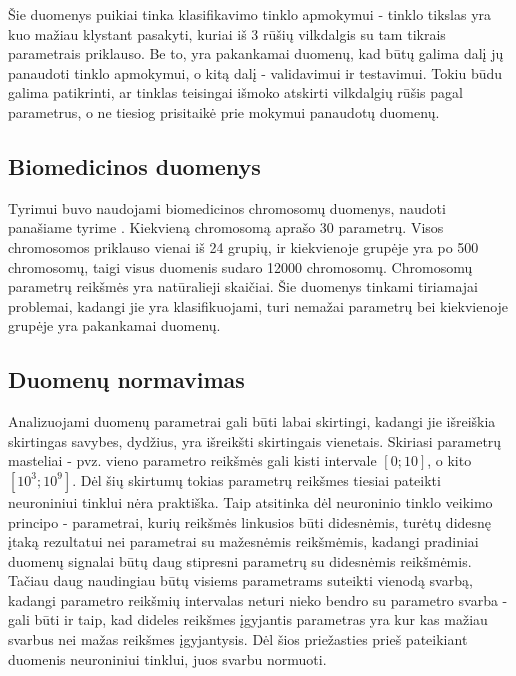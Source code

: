 \documentclass{VUMIFPSbakalaurinis}
\begin{document}
Šie duomenys puikiai tinka klasifikavimo tinklo apmokymui - tinklo tikslas yra kuo mažiau klystant pasakyti, kuriai iš 3 rūšių vilkdalgis su tam tikrais parametrais priklauso.
Be to, yra pakankamai duomenų, kad būtų galima dalį jų panaudoti tinklo apmokymui, o kitą dalį - validavimui ir testavimui.
Tokiu būdu galima patikrinti, ar tinklas teisingai išmoko atskirti vilkdalgių rūšis pagal parametrus, o ne tiesiog prisitaikė prie mokymui panaudotų duomenų.



\subsection{Biomedicinos duomenys}

Tyrimui buvo naudojami biomedicinos chromosomų duomenys, naudoti panašiame tyrime \cite[289~psl.]{price-dimensionality-reduction}.
Kiekvieną chromosomą aprašo 30 parametrų.
Visos chromosomos priklauso vienai iš 24 grupių, ir kiekvienoje grupėje yra po 500 chromosomų, taigi visus duomenis sudaro 12000 chromosomų.
Chromosomų parametrų reikšmės yra natūralieji skaičiai.
Šie duomenys tinkami tiriamajai problemai, kadangi jie yra klasifikuojami, turi nemažai parametrų bei kiekvienoje grupėje yra pakankamai duomenų.



\subsection{Duomenų normavimas}

Analizuojami duomenų parametrai gali būti labai skirtingi, kadangi jie išreiškia skirtingas savybes, dydžius, yra išreikšti skirtingais vienetais.
Skiriasi parametrų masteliai - pvz. vieno parametro reikšmės gali kisti intervale $[0; 10]$, o kito $[10^3; 10^9]$.
Dėl šių skirtumų tokias parametrų reikšmes tiesiai pateikti neuroniniui tinklui nėra praktiška.
Taip atsitinka dėl neuroninio tinklo veikimo principo - parametrai, kurių reikšmės linkusios būti didesnėmis, turėtų didesnę įtaką rezultatui nei parametrai su mažesnėmis reikšmėmis, kadangi pradiniai duomenų signalai būtų daug stipresni parametrų su didesnėmis reikšmėmis.
Tačiau daug naudingiau būtų visiems parametrams suteikti vienodą svarbą, kadangi parametro reikšmių intervalas neturi nieko bendro su parametro svarba - gali būti ir taip, kad dideles reikšmes įgyjantis parametras yra kur kas mažiau svarbus nei mažas reikšmes įgyjantysis.
Dėl šios priežasties prieš pateikiant duomenis neuroniniui tinklui, juos svarbu normuoti.
\end{document}
